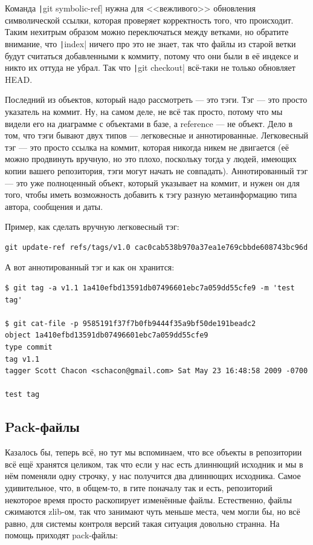 \documentclass[a5paper]{article}
\begin{document}
Команда \texttt|git symbolic-ref| нужна для <<вежливого>> обновления символической ссылки, которая проверяет корректность того, что происходит. Таким нехитрым образом можно переключаться между ветками, но обратите внимание, что \texttt|index| ничего про это не знает, так что файлы из старой ветки будут считаться добавленными к коммиту, потому что они были в её индексе и никто их оттуда не убрал. Так что \texttt|git checkout| всё-таки не только обновляет HEAD.

Последний из объектов, который надо рассмотреть --- это тэги. Тэг --- это просто указатель на коммит. Ну, на самом деле, не всё так просто, потому что мы видели его на диаграмме с объектами в базе, а reference --- не объект. Дело в том, что тэги бывают двух типов --- легковесные и аннотированные. Легковесный тэг --- это просто ссылка на коммит, которая никогда никем не двигается (её можно продвинуть вручную, но это плохо, поскольку тогда у людей, имеющих копии вашего репозитория, тэги могут начать не совпадать). Аннотированный тэг --- это уже полноценный объект, который указывает на коммит, и нужен он для того, чтобы иметь возможность добавить к тэгу разную метаинформацию типа автора, сообщения и даты.

Пример, как сделать вручную легковесный тэг:
\begin{verbatim}
git update-ref refs/tags/v1.0 cac0cab538b970a37ea1e769cbbde608743bc96d
\end{verbatim}

А вот аннотированный тэг и как он хранится:
\begin{verbatim}
$ git tag -a v1.1 1a410efbd13591db07496601ebc7a059dd55cfe9 -m 'test tag'

$ git cat-file -p 9585191f37f7b0fb9444f35a9bf50de191beadc2
object 1a410efbd13591db07496601ebc7a059dd55cfe9
type commit
tag v1.1
tagger Scott Chacon <schacon@gmail.com> Sat May 23 16:48:58 2009 -0700

test tag
\end{verbatim}

\subsection{Pack-файлы}

Казалось бы, теперь всё, но тут мы вспоминаем, что все объекты в репозитории всё ещё хранятся целиком, так что если у нас есть длиннющий исходник и мы в нём поменяли одну строчку, у нас получится два длиннющих исходника. Самое удивительное, что, в общем-то, в гите поначалу так и есть, репозиторий некоторое время просто раскопирует изменённые файлы. Естественно, файлы сжимаются zlib-ом, так что занимают чуть меньше места, чем могли бы, но всё равно, для системы контроля версий такая ситуация довольно странна. На помощь приходят pack-файлы:
\end{document}

